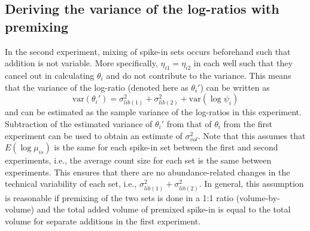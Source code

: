 \documentclass{article}
\begin{document}
\subsection{Deriving the variance of the log-ratios with premixing}
In the second experiment, mixing of spike-in sets occurs beforehand such that addition is not variable.
More specifically, $\eta_{i1}=\eta_{i2}$ in each well such that they cancel out in calculating $\theta_i$ and do not contribute to the variance.
This means that the variance of the log-ratio (denoted here as $\theta_i'$) can be written as
\[
    \mbox{var}(\theta_i') = \sigma^2_{lib(1)} + \sigma^2_{lib(2)} + \mbox{var}(\log \psi_i)
\]
and can be estimated as the sample variance of the log-ratios in this experiment.
Subtraction of the estimated variance of $\theta_i'$ from that of $\theta_i$ from the first experiment can be used to obtain an estimate of $\sigma^2_{vol}$.
Note that this assumes that $E(\log \mu_{is})$ is the same for each spike-in set between the first and second experiments, i.e., the average count size for each set is the same between experiments.
This ensures that there are no abundance-related changes in the technical variability of each set, i.e., $ \sigma^2_{lib(1)} + \sigma^2_{lib(2)}$.
In general, this assumption is reasonable if premixing of the two sets is done in a 1:1 ratio (volume-by-volume) and the total added volume of premixed spike-in is equal to the total volume for separate additions in the first experiment.

\end{document}
